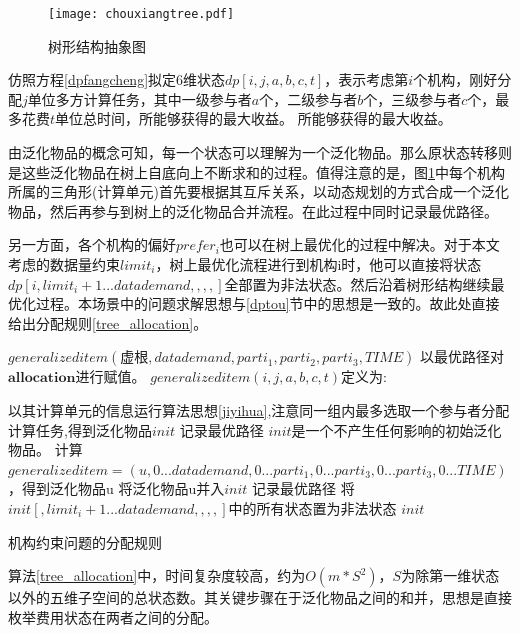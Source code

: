 \documentclass[promaster]{thesis-uestc}
\begin{document}
\begin{figure}[h]
    \texttt{[image: chouxiangtree.pdf]}
    \caption{树形结构抽象图}
    \label{chouxiangtree}
\end{figure}

仿照方程\ref{dpfangcheng}拟定6维状态$dp[i,j,a,b,c,t]$，表示考虑第$i$个机构，刚好分配$j$单位多方计算任务，其中一级参与者$a$个，二级参与者$b$个，三级参与者$c$个，最多花费$t$单位总时间，所能够获得的最大收益。
所能够获得的最大收益。

由泛化物品的概念可知，每一个状态可以理解为一个泛化物品。那么原状态转移则是这些泛化物品在树上自底向上不断求和的过程。值得注意的是，图\ref{chouxiangtree}中每个机构所属的三角形(计算单元)首先要根据其互斥关系，以动态规划的方式合成一个泛化物品，然后再参与到树上的泛化物品合并流程。在此过程中同时记录最优路径。

另一方面，各个机构的偏好$prefer_i$也可以在树上最优化的过程中解决。对于本文考虑的数据量约束$limit_i$，树上最优化流程进行到机构i时，他可以直接将状态$dp[i,limit_i+1...datademand,,,,]$全部置为非法状态。然后沿着树形结构继续最优化过程。本场景中的问题求解思想与\ref{dptou}节中的思想是一致的。故此处直接给出分配规则\ref{tree_allocation}。

\begin{algorithm}[h]
    $generalizeditem(\text{虚根},datademand,parti_1,parti_2,parti_3,TIME)$\;
    以最优路径对$\mathbf{allocation}$进行赋值。\;
    \;
    $generalizeditem(i,j,a,b,c,t)$定义为:\;
    
    {
        以其计算单元的信息运行算法思想\ref{jiyihua},注意同一组内最多选取一个参与者分配计算任务,得到泛化物品$init$\;
        记录最优路径\;
    }{
        $init$是一个不产生任何影响的初始泛化物品。
    }
    {
        计算$generalizeditem=(u,0...datademand,0...parti_1,0...parti_3,0...parti_3,0...TIME)$，得到泛化物品u\;
        将泛化物品u并入$init$\;
        记录最优路径\;
    }
    将$init[,limit_i+1...datademand,,,,]$中的所有状态置为非法状态\;
    \Return $init$\;
\caption{机构约束问题的分配规则}
\label{tree_allocation}
\end{algorithm}

算法\ref{tree_allocation}中，时间复杂度较高，约为$O(m*S^2)$，$S$为除第一维状态以外的五维子空间的总状态数。其关键步骤在于泛化物品之间的和并，思想是直接枚举费用状态在两者之间的分配。
\end{document}

